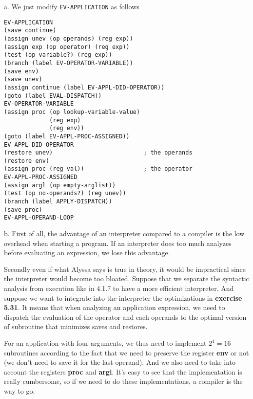 \documentclass[a4paper,12pt]{article}
\newcommand{\subpar}[1]{\medskip \noindent #1.}
\begin{document}
\subpar{a}  We just modify \lstinline!EV-APPLICATION! as follows
\begin{lstlisting}
EV-APPLICATION
(save continue)
(assign unev (op operands) (reg exp))
(assign exp (op operator) (reg exp))
(test (op variable?) (reg exp))
(branch (label EV-OPERATOR-VARIABLE))
(save env)
(save unev)
(assign continue (label EV-APPL-DID-OPERATOR))
(goto (label EVAL-DISPATCH))
EV-OPERATOR-VARIABLE
(assign proc (op lookup-variable-value)
             (reg exp)
             (reg env))
(goto (label EV-APPL-PROC-ASSIGNED))
EV-APPL-DID-OPERATOR
(restore unev)                          ; the operands
(restore env)
(assign proc (reg val))                 ; the operator
EV-APPL-PROC-ASSIGNED
(assign argl (op empty-arglist))
(test (op no-operands?) (reg unev))
(branch (label APPLY-DISPATCH))
(save proc)
EV-APPL-OPERAND-LOOP
\end{lstlisting}

\subpar{b} First of all, the advantage of an interpreter compared to a
compiler is the low overhead when starting a program.  If an
interpreter does too much analyzes before evaluating an expression, we
lose this advantage.

Secondly even if what Alyssa says is true in theory, it would be
impractical since the interpreter would become too bloated.  Suppose
that we separate the syntactic analysis from execution like in 4.1.7
to have a more efficient interpreter.  And suppose we want to
integrate into the interpreter the optimizations in \textbf{exercise
  5.31}.  It means that when analyzing an application expression, we
need to dispatch the evaluation of the operator and each operands to
the optimal version of subroutine that minimizes saves and restores.

For an application with four arguments, we thus need to implement $2^4
= 16$ subroutines according to the fact that we need to preserve the
register \textbf{env} or not (we don't need to save it for the last
operand).  And we also need to take into account the registers
\textbf{proc} and \textbf{argl}.  It's easy to see that the
implementation is really cumbersome, so if we need to do these
implementations, a compiler is the way to go.
\end{document}
